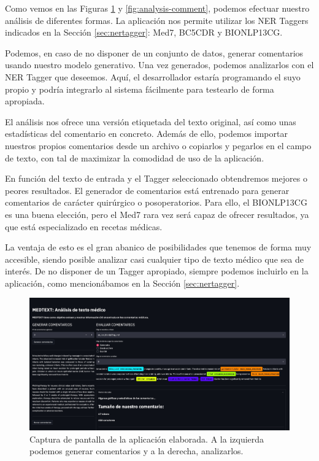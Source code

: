 Como vemos en las Figuras \ref{fig:app-demo} y \ref{fig:analysis-comment}, podemos efectuar nuestro análisis de diferentes formas. La aplicación nos permite utilizar los NER Taggers indicados en la Sección \ref{sec:nertagger}: Med7, BC5CDR y BIONLP13CG.

Podemos, en caso de no disponer de un conjunto de datos, generar comentarios usando nuestro modelo generativo. Una vez generados, podemos analizarlos con el NER Tagger que deseemos. Aquí, el desarrollador estaría programando el suyo propio y podría integrarlo al sistema fácilmente para testearlo de forma apropiada. 

El análisis nos ofrece una versión etiquetada del texto original, así como unas estadísticas del comentario en concreto. Además de ello, podemos importar nuestros propios comentarios desde un archivo o copiarlos y pegarlos en el campo de texto, con tal de maximizar la comodidad de uso de la aplicación.

En función del texto de entrada y el Tagger seleccionado obtendremos mejores o peores resultados. El generador de comentarios está entrenado para generar comentarios de carácter quirúrgico o posoperatorios. Para ello, el BIONLP13CG es una buena elección, pero el Med7 rara vez será capaz de ofrecer resultados, ya que está especializado en recetas médicas.

La ventaja de esto es el gran abanico de posibilidades que tenemos de forma muy accesible, siendo posible analizar casi cualquier tipo de texto médico que sea de interés. De no disponer de un Tagger apropiado, siempre podemos incluirlo en la aplicación, como mencionábamos en la Sección \ref{sec:nertagger}.

\begin{figure}[h]
	\centering
	\includegraphics[width=.9\textwidth]{media/app_demo.jpeg}
	\caption{Captura de pantalla de la aplicación elaborada. A la izquierda podemos generar comentarios y a la derecha, analizarlos.}
	\label{fig:app-demo}
\end{figure}


